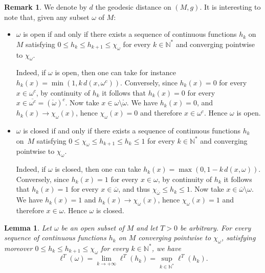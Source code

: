 \documentclass[10pt]{amsart}
\def\N{\mathbb{N}}
\newtheorem{lemma}{Lemma}
\theoremstyle{definition}
\newtheorem{remark}{Remark}
\begin{document}
\begin{remark}\label{rem_openclosed}
We denote by $d$ the geodesic distance on $(M,g)$. It is interesting to note that, given any subset $\omega$ of $M$:
\begin{itemize}
\item $\omega$ is open if and only if there exists a sequence of continuous functions $h_k$ on $M$ satisfying $0\leq h_k\leq h_{k+1}\leq\chi_\omega$ for every $k\in\N^*$ and converging pointwise to $\chi_\omega$.

Indeed, if $\omega$ is open, then one can take for instance $h_k(x) = \min(1, k\, d(x,\omega^c))$. Conversely, since $h_k(x)=0$ for every $x\in\omega^c$, by continuity of $h_k$ it follows that $h_k(x)=0$ for every $x\in\overline{\omega^c}=(\mathring{\omega})^c$. Now take $x\in\omega\setminus\mathring{\omega}$. We have $h_k(x)= 0$, and $h_k(x)\rightarrow\chi_\omega(x)$, hence $\chi_\omega(x)=0$ and therefore $x\in\omega^c$. Hence $\omega$ is open.

\item $\omega$ is closed if and only if there exists a sequence of continuous functions $h_k$ on~$M$ satisfying $0\leq \chi_{\omega}\leq h_{k+1}\leq h_k\leq 1$ for every $k\in\N^*$ and converging pointwise to $\chi_\omega$.

Indeed, if $\omega$ is closed, then one can take $h_k(x) = \max(0,1-k\, d(x,\omega))$. Conversely, since $h_k(x)=1$ for every $x\in\omega$, by continuity of $h_k$ it follows that $h_k(x)=1$ for every $x\in\overline{\omega}$, and thus $\chi_{\overline{\omega}}\leq h_k\leq 1$. Now take $x\in\overline{\omega}\setminus\omega$. We have $h_k(x)=1$ and $h_k(x)\rightarrow\chi_\omega(x)$, hence $\chi_\omega(x)=1$ and therefore $x\in\omega$. Hence $\omega$ is closed.
\end{itemize}
\end{remark}

\begin{lemma}\label{lemopen}
Let $\omega$ be an open subset of $M$ and let $T>0$ be arbitrary. For every sequence of continuous functions $h_k$ on $M$ converging pointwise to $\chi_\omega$, satisfying moreover $0\leq h_k\leq h_{k+1}\leq\chi_\omega$ for every $k\in\N^*$, we have
\[
\ell^T(\omega) = \lim_{k\rightarrow +\infty} \ell^T(h_k) = \sup_{k\in\N^*} \ell^T(h_k).
\]
\end{lemma}
\end{document}

